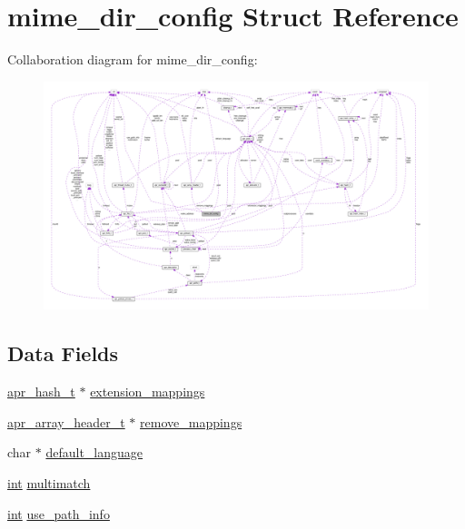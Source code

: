 \hypertarget{structmime__dir__config}{}\section{mime\+\_\+dir\+\_\+config Struct Reference}
\label{structmime__dir__config}


Collaboration diagram for mime\+\_\+dir\+\_\+config\+:
\nopagebreak
\begin{figure}[H]
\begin{center}
\leavevmode
\includegraphics[width=350pt]{structmime__dir__config__coll__graph}
\end{center}
\end{figure}
\subsection*{Data Fields}
\begin{DoxyCompactItemize}
\item 
\hyperlink{structapr__hash__t}{apr\+\_\+hash\+\_\+t} $\ast$ \hyperlink{structmime__dir__config_a57a7adf62ebb581764d31e5b17517212}{extension\+\_\+mappings}
\item 
\hyperlink{structapr__array__header__t}{apr\+\_\+array\+\_\+header\+\_\+t} $\ast$ \hyperlink{structmime__dir__config_a8d138c762f31abeb57744ff41864bc07}{remove\+\_\+mappings}
\item 
char $\ast$ \hyperlink{structmime__dir__config_a9948d5fe07734af2974204eb9e32d864}{default\+\_\+language}
\item 
\hyperlink{pcre_8txt_a42dfa4ff673c82d8efe7144098fbc198}{int} \hyperlink{structmime__dir__config_ab94b35457838da9941adb6fbc1bfe8a2}{multimatch}
\item 
\hyperlink{pcre_8txt_a42dfa4ff673c82d8efe7144098fbc198}{int} \hyperlink{structmime__dir__config_a8e1626f9720547567876b93daa68436f}{use\+\_\+path\+\_\+info}
\end{DoxyCompactItemize}


